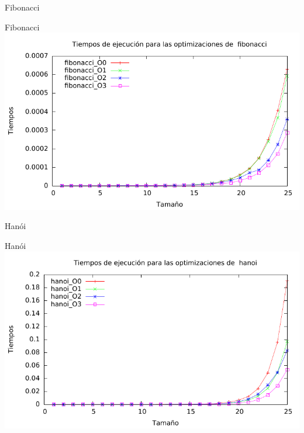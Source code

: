 \documentclass[10pt,compress,usetitleprogressbar,mathserif]{beamer}
\begin{document}
\begin{frame}{Fibonacci}
	
\end{frame}

\begin{frame}{Fibonacci}
	\includegraphics[width = \textwidth ]{img/fibonacci_optim_g.pdf}
\end{frame}

\begin{frame}{Hanói}
	
\end{frame}

\begin{frame}{Hanói}
	\includegraphics[width = \textwidth ]{img/hanoi_optim_g.pdf}
\end{frame}
\end{document}
